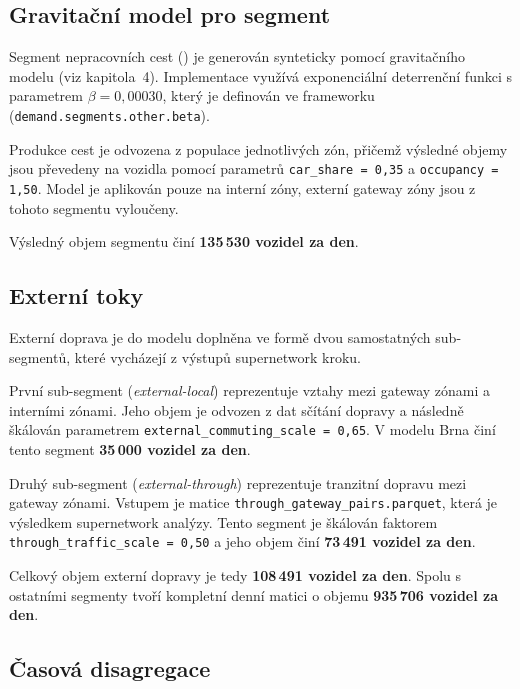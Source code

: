 \subsection{Gravitační model pro segment }
\label{sec:impl-demand-gravity}

Segment nepracovních cest () je generován synteticky pomocí gravitačního modelu (viz kapitola~4). Implementace využívá exponenciální deterrenční funkci s parametrem $\beta = 0{,}00030$, který je definován ve frameworku (\texttt{demand.segments.other.beta}).

Produkce cest je odvozena z populace jednotlivých zón, přičemž výsledné objemy jsou převedeny na vozidla pomocí parametrů \texttt{car\_share = 0{,}35} a \texttt{occupancy = 1{,}50}. Model je aplikován pouze na interní zóny, externí gateway zóny jsou z tohoto segmentu vyloučeny.

Výsledný objem segmentu  činí \textbf{135\,530 vozidel za den}.

\subsection{Externí toky}
\label{sec:impl-demand-external}

Externí doprava je do modelu doplněna ve formě dvou samostatných sub-segmentů, které vycházejí z výstupů supernetwork kroku.

První sub-segment (\textit{external-local}) reprezentuje vztahy mezi gateway zónami a interními zónami. Jeho objem je odvozen z dat sčítání dopravy a následně škálován parametrem \texttt{external\_commuting\_scale = 0{,}65}. V modelu Brna činí tento segment \textbf{35\,000 vozidel za den}.

Druhý sub-segment (\textit{external-through}) reprezentuje tranzitní dopravu mezi gateway zónami. Vstupem je matice \texttt{through\_gateway\_pairs.parquet}, která je výsledkem supernetwork analýzy. Tento segment je škálován faktorem \texttt{through\_traffic\_scale = 0{,}50} a jeho objem činí \textbf{73\,491 vozidel za den}.

Celkový objem externí dopravy je tedy \textbf{108\,491 vozidel za den}. Spolu s ostatními segmenty tvoří kompletní denní matici o objemu \textbf{935\,706 vozidel za den}.

\subsection{Časová disagregace}
\label{sec:impl-demand-temporal}

